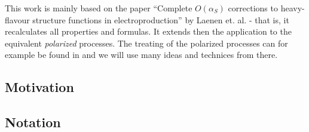 This work is mainly based on the paper \enquote{Complete {$O(\alpha_S)$} corrections to heavy-flavour structure functions in electroproduction} by Laenen et. al.\cite{Laenen1993162} - that is, it recalculates all properties and formulas. It extends then the application to the equivalent \textit{polarized} processes. The treating of the polarized processes can for example be found in \cite{Bojak:2000eu} and we will use many ideas and technices from there.

\subsection{Motivation}

\subsection{Notation}

